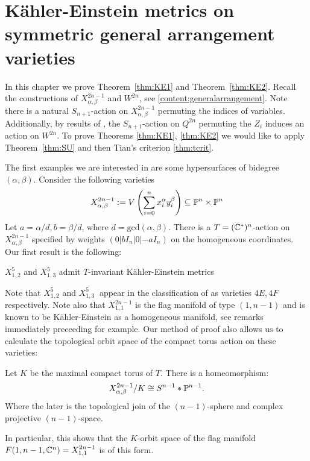 \chapter{K\"ahler-Einstein metrics on symmetric general arrangement varieties} \label{chap:gav}
In this chapter we prove Theorem~\ref{thm:KE1} and Theorem~\ref{thm:KE2}. Recall the constructions of \(X_{\alpha,\beta}^{2n-1}\) and \(W^{2n}\), see \ref{content:generalarrangement}. Note there is a natural \(S_{n+1}\)-action on \(X^{2n-1}_{\alpha,\beta}\) permuting the indices of variables. Additionally, by results of \cite{li06}, the \(S_{n+1}\)-action on \(Q^{2n}\) permuting the \(Z_i\) induces an action on \(W^{2n}\). To prove Theorems \ref{thm:KE1}, \ref{thm:KE2} we would like to apply Theorem~\ref{thm:SU} and then Tian's criterion \ref{thm:tcrit}.


The first examples we are interested in are some hypersurfaces of  bidegree \((\alpha,\beta)\). Consider the following varieties
\[
X_{\alpha,\beta}^{2n-1} := V \left( \sum_{i=0}^n x_i^\alpha y_i^\beta \right) \subseteq \mathbb{P}^n \times \mathbb{P}^n
\]
%
%
Let \(a = \alpha/d, b = \beta/d\), where \(d = \text{gcd}(\alpha,\beta)\). There is a \(T = (\mathbb{C}^*)^n\)-action on \(X_{\alpha,\beta}^{2n-1}\) specified by weights \((0|b I_n|0|-a I_n)\) on the homogeneous coordinates. Our first result is the following:
\begin{theorem}\label{thm:KE1}
\(X_{1,2}^5\) and \( X_{1,3}^5\) admit \(T\)-invariant K\"ahler-Einstein metrics
\end{theorem}
Note that \(X_{1,2}^5\) and \(X_{1,3}^5\ \) appear in the classification of \cite{hausen2018torus} as varieties \(4E, 4F\) respectively. Note also that \(X_{1,1}^{2n-1}\) is the flag manifold of type \((1,n-1)\) and is known to be K\"ahler-Einstein as a homogeneous manifold, see remarks immediately preceeding \cite[Theorem 3]{Matsushima} for example. Our method of proof also allows us to calculate the topological orbit space of the compact torus action on these varieties:
\begin{corollary}\label{cor:topquot}
Let \(K\) be the maximal compact torus of \(T\). There is a homeomorphism:
\[
X_{\alpha,\beta}^{2n-1}/K \cong S^{n-1} \ast \mathbb{P}^{n-1}.
\]
Where the later is the topological join of the \((n-1)\)-sphere and complex projective \((n-1)\)-space. 
\end{corollary}
In particular, this shows that the \(K\)-orbit space of the flag manifold \(F(1,n-1,\mathbb{C}^n) = X_{1,1}^{2n-1}\) is of this form.

